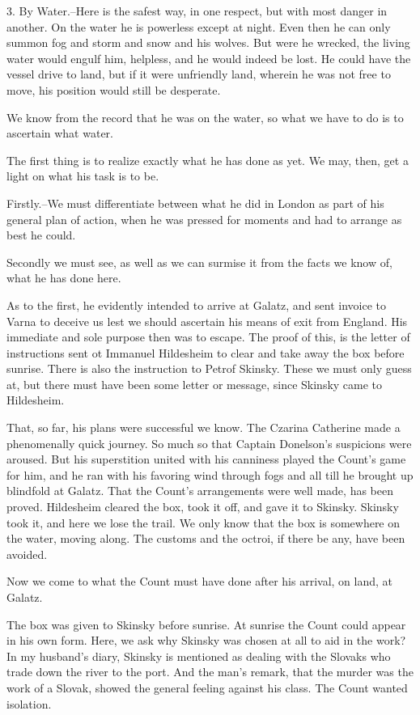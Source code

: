3. By Water.--Here is the safest way, in one respect, but with most danger in another. On the water he is powerless except at night. Even then he can only summon fog and storm and snow and his wolves. But were he wrecked, the living water would engulf him, helpless, and he would indeed be lost. He could have the vessel drive to land, but if it were unfriendly land, wherein he was not free to move, his position would still be desperate. 

We know from the record that he was on the water, so what we have to do is to ascertain what water. 

The first thing is to realize exactly what he has done as yet. We may, then, get a light on what his task is to be. 

Firstly.--We must differentiate between what he did in London as part of his general plan of action, when he was pressed for moments and had to arrange as best he could. 

Secondly we must see, as well as we can surmise it from the facts we know of, what he has done here. 

As to the first, he evidently intended to arrive at Galatz, and sent invoice to Varna to deceive us lest we should ascertain his means of exit from England. His immediate and sole purpose then was to escape. The proof of this, is the letter of instructions sent ot Immanuel Hildesheim to clear and take away the box before sunrise. There is also the instruction to Petrof Skinsky. These we must only guess at, but there must have been some letter or message, since Skinsky came to Hildesheim. 

That, so far, his plans were successful we know. The Czarina Catherine made a phenomenally quick journey. So much so that Captain Donelson's suspicions were aroused. But his superstition united with his canniness played the Count's game for him, and he ran with his favoring wind through fogs and all till he brought up blindfold at Galatz. That the Count's arrangements were well made, has been proved. Hildesheim cleared the box, took it off, and gave it to Skinsky. Skinsky took it, and here we lose the trail. We only know that the box is somewhere on the water, moving along. The customs and the octroi, if there be any, have been avoided. 

Now we come to what the Count must have done after his arrival, on land, at Galatz. 

The box was given to Skinsky before sunrise. At sunrise the Count could appear in his own form. Here, we ask why Skinsky was chosen at all to aid in the work? In my husband's diary, Skinsky is mentioned as dealing with the Slovaks who trade down the river to the port. And the man's remark, that the murder was the work of a Slovak, showed the general feeling against his class. The Count wanted isolation. 

